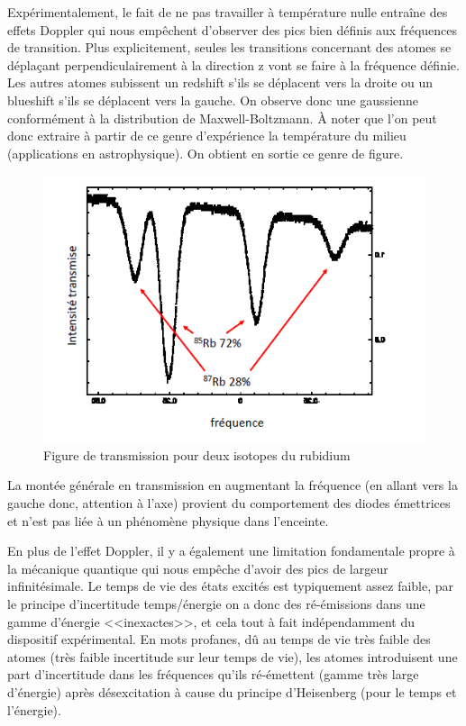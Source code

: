 Expérimentalement, le fait de ne pas travailler à température nulle entraîne des effets Doppler qui nous empêchent d'observer des pics bien définis aux fréquences de transition. Plus explicitement, seules les transitions concernant des atomes se déplaçant perpendiculairement à la direction z vont se faire à la fréquence définie. Les autres atomes subissent un redshift s'ils se déplacent vers la droite ou un blueshift s'ils se déplacent vers la gauche. On observe donc une gaussienne conformément à la distribution de Maxwell-Boltzmann. À noter que l'on peut donc extraire à partir de ce genre d'expérience la température du milieu (applications en astrophysique). On obtient en sortie ce genre de figure.\\

\begin{figure}[htp]
    \centering
    \includegraphics[scale=1.0]{Images2/Absorption.PNG}
    \caption{Figure de transmission pour deux isotopes du rubidium}
    \label{fig:abso}
\end{figure}

La montée générale en transmission en augmentant la fréquence (en allant vers la gauche donc, attention à l'axe) provient du comportement des diodes émettrices et n'est pas liée à un phénomène physique dans l'enceinte.

En plus de l'effet Doppler, il y a également une limitation fondamentale propre à la mécanique quantique qui nous empêche d'avoir des pics de largeur infinitésimale. Le temps de vie des états excités est typiquement assez faible, par le principe d'incertitude temps/énergie on a donc des ré-émissions dans une gamme d'énergie <<inexactes>>, et cela tout à fait indépendamment du dispositif expérimental. En mots profanes, dû au temps de vie très faible des atomes (très faible incertitude sur leur temps de vie), les atomes introduisent une part d'incertitude dans les fréquences qu'ils ré-émettent (gamme très large d'énergie) après désexcitation à cause du principe d'Heisenberg (pour le temps et l'énergie).\\

